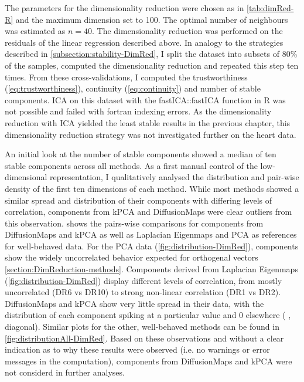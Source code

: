 The parameters for the dimensionality reduction were chosen as in \cref{tab:dimRed-R} and the maximum dimension set to \num{100}. The optimal number of neighbours was estimated as \(n=40\).  The dimensionality reduction was performed on the residuals of the linear regression described above. 
In analogy to the strategies described in \cref{subsection:stability-DimRed}, I split the dataset into subsets of \num{80}\% of the samples, computed the dimensionality reduction and repeated this step ten times. From these cross-validations, I computed the trustworthiness (\cref{eq:trustworthiness}), continuity (\cref{eq:continuity}) and number of stable components. ICA on this dataset with the fastICA::fastICA function in R was not possible and failed with fortran indexing errors. As the dimensionality reduction with ICA yielded the least stable results in the previous chapter, this dimensionality reduction strategy was not investigated further on the heart data.  

An initial look at the number of stable components showed a median of ten stable components across all methods. As a first manual control of the low-dimensional representation, I qualitatively analysed the distribution and pair-wise density of the first ten dimensions of each method. While most methods showed a similar spread and distribution of their components with differing levels of correlation, components from kPCA and DiffusionMaps were clear outliers from this observation.  shows the pairs-wise comparisons for components from DiffusionMaps and kPCA as well as Laplacian Eigenmaps and PCA as references for well-behaved data. For the PCA data (\cref{fig:distribution-DimRed}), components show the widely uncorrelated behavior expected for orthogenal vectors \cref{section:DimReduction-methods}. Components derived from Laplacian Eigenmaps (\cref{fig:distribution-DimRed}) display different levels of correlation, from mostly uncorrelated (DR6 vs DR10) to strong non-linear correlation (DR1 vs DR2). DiffusionMaps and kPCA show very little spread in their data, with the distribution of each component spiking at a particular value and \num{0} elsewhere ( , diagonal). Similar plots for the other, well-behaved methods can be found in \cref{fig:distributionAll-DimRed}. Based on these observations and without a clear indication as to why these results were observed (i.e. no warnings or error messages in the computation), components from DiffusionMaps and kPCA were not considerd in further analyses. 

